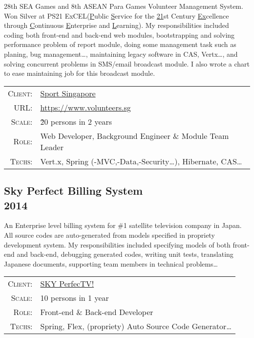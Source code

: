 \documentclass[a4paper,10pt]{article}
\begin{document}
28th SEA Games and 8th ASEAN Para Games Volunteer Management System.
Won Silver at PS21 ExCEL(\underline{P}ublic \underline{S}ervice for the \underline{21}st Century \underline{Ex}cellence through \underline{C}ontinuous \underline{E}nterprise and \underline{L}earning).
My responsibilities included coding both front-end and back-end web modules,
bootstrapping and solving performance problem of report module,
doing some management task such as planing, bug management\ldots,
maintaining legacy software in CAS, Vertx\ldots,
and solving concurrent problems in SMS/email broadcast module.
I also wrote a chart to ease maintaining job for this broadcast module.

\begin{tabular}{rl}
    \textsc{Client:} & \href{http://www.sportsingapore.gov.sg/}{Sport Singapore}\\
    \textsc{URL:} & \url{https://www.volunteers.sg}\\
    \textsc{Scale:} & \~20 persons in 2 years\\
    \textsc{Role:} & Web Developer, Background Engineer \& Module Team Leader\\
    \textsc{Techs:} & Vert.x, Spring (-MVC,-Data,-Security\ldots), Hibernate, CAS\ldots\\
\end{tabular}


\subsection*{Sky Perfect Billing System\\\small 2014}

An Enterprise level billing system for \#1 satellite television company in Japan.
All source codes are auto-generated from models specified in propriety development system.
My responsibilities included specifying models of both front-end and back-end, debugging generated codes, writing unit tests,
translating Japanese documents, supporting team members in technical problems\ldots

\begin{tabular}{rl}
    \textsc{Client:} & \href{https://www.skyperfectv.co.jp/eng/}{SKY PerfecTV!}\\
    \textsc{Scale:} & 10 persons in 1 year\\
    \textsc{Role:} & Front-end \& Back-end Developer\\
    \textsc{Techs:} & Spring, Flex, (propriety) Auto Source Code Generator\ldots\\
\end{tabular}
\end{document}
